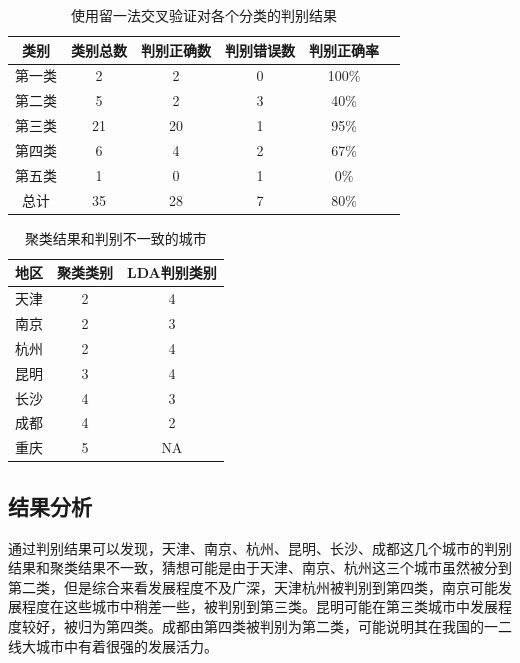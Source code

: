 \documentclass [a4paper]{article}
\begin{document}
\begin{table}[h]
  \centering
  \caption{使用留一法交叉验证对各个分类的判别结果}
  \small %
  \begin{tabular}{cccccc}
  \toprule
 类别	& 类别总数 & 判别正确数 & 判别错误数 &判别正确率\\
  \midrule
  第一类	& 2 & 2 & 0 &100\% \\
  第二类	& 5 & 2 & 3 &40\% \\
  第三类	& 21 & 20 & 1 &95\% \\
  第四类	& 6 & 4 & 2 &67\% \\
  第五类	& 1 & 0 & 1 &0\% \\
  总计	& 35 & 28 & 7 &80\% \\
  \bottomrule
  \end{tabular}
\end{table}
\begin{table}[h]
  \centering
  \caption{聚类结果和判别不一致的城市}
  \small %
  \begin{tabular}{ccc}
  \toprule
 地区	& 聚类类别	& 	 LDA判别类别\\
  \midrule
  天津	& 	2	& 	4\\
  南京	& 	2	& 	3\\
  杭州		& 2	  & 4\\
  昆明		& 3		& 4\\
  长沙		& 4	& 	3\\
  成都	& 	4	& 	2\\
  重庆 & 5 & NA\\
  \bottomrule
  \end{tabular}
\end{table}


\subsection{结果分析}
通过判别结果可以发现，天津、南京、杭州、昆明、长沙、成都这几个城市的判别结果和聚类结果不一致，猜想可能是由于天津、南京、杭州这三个城市虽然被分到第二类，但是综合来看发展程度不及广深，天津杭州被判别到第四类，南京可能发展程度在这些城市中稍差一些，被判别到第三类。昆明可能在第三类城市中发展程度较好，被归为第四类。成都由第四类被判别为第二类，可能说明其在我国的一二线大城市中有着很强的发展活力。
\end{document}
